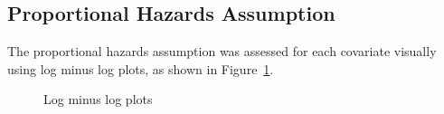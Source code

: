 \documentclass[
  letterpaper,
  DIV=11,
  numbers=noendperiod]{scrartcl}
\begin{document}
\begin{table}

\caption{\label{tbl-table1}{Clinicopathological characteristics by
cancer subtype}}


\end{table}%

\clearpage

\subsection{Proportional Hazards
Assumption}\label{proportional-hazards-assumption}

The proportional hazards assumption was assessed for each covariate
visually using log minus log plots, as shown in Figure~\ref{fig-loglog}.

\begin{figure}


\caption{\label{fig-loglog}{Log minus log plots}}

\end{figure}%
\end{document}
